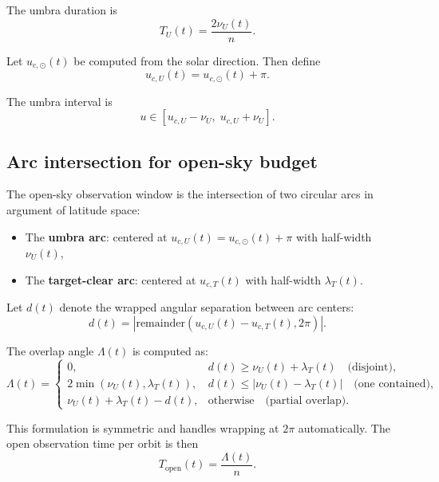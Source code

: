 \documentclass[preprint,12pt]{elsarticle}
\theoremstyle{definition}
\theoremstyle{remark}
\begin{document}
The umbra duration is
\begin{equation}
T_U(t)=\frac{2\nu_U(t)}{n}.
\label{eq:t_umbra}
\end{equation}

Let $u_{c,\odot}(t)$ be computed from the solar direction. Then define
\begin{equation}
u_{c,U}(t)=u_{c,\odot}(t)+\pi.
\label{eq:uc_umbra}
\end{equation}

The umbra interval is
\begin{equation}
u\in[u_{c,U}-\nu_U,\;u_{c,U}+\nu_U].
\end{equation}

\subsection{Arc intersection for open-sky budget}

The open-sky observation window is the intersection of two circular arcs in argument of latitude space:
\begin{itemize}
\item The \textbf{umbra arc}: centered at $u_{c,U}(t)=u_{c,\odot}(t)+\pi$ with half-width $\nu_U(t)$,
\item The \textbf{target-clear arc}: centered at $u_{c,T}(t)$ with half-width $\lambda_T(t)$.
\end{itemize}

Let $d(t)$ denote the wrapped angular separation between arc centers:
\begin{equation}
d(t)=\left|\mathrm{remainder}\!\left(u_{c,U}(t)-u_{c,T}(t),2\pi\right)\right|.
\label{eq:wrapped_dist}
\end{equation}

The overlap angle $\Lambda(t)$ is computed as:
\begin{equation}
\Lambda(t)=
\begin{cases}
0, & d(t) \ge \nu_U(t)+\lambda_T(t) \quad \text{(disjoint)},\\
2\min(\nu_U(t),\lambda_T(t)), & d(t) \le |\nu_U(t)-\lambda_T(t)| \quad \text{(one contained)},\\
\nu_U(t)+\lambda_T(t)-d(t), & \text{otherwise} \quad \text{(partial overlap)}.
\end{cases}
\label{eq:Lambda}
\end{equation}

This formulation is symmetric and handles wrapping at $2\pi$ automatically.
The open observation time per orbit is then
\begin{equation}
T_{\mathrm{open}}(t)=\frac{\Lambda(t)}{n}.
\label{eq:Topen}
\end{equation}
\end{document}
